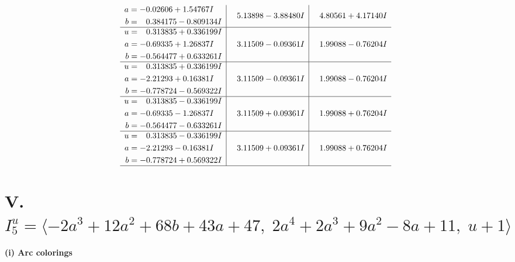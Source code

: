 \documentclass[1p]{elsarticle_modified}
\theoremstyle{definition}
\begin{document}
$$\begin{array}{c|c|c}
\begin{aligned}
a &= -0.02606 + 1.54767 I \\
b &= \phantom{-}0.384175 - 0.809134 I\end{aligned}
 & \phantom{-}5.13898 - 3.88480 I & \phantom{-}4.80561 + 4.17140 I \\ \hline\begin{aligned}
u &= \phantom{-}0.313835 + 0.336199 I \\
a &= -0.69335 + 1.26837 I \\
b &= -0.564477 + 0.633261 I\end{aligned}
 & \phantom{-}3.11509 - 0.09361 I & \phantom{-}1.99088 - 0.76204 I \\ \hline\begin{aligned}
u &= \phantom{-}0.313835 + 0.336199 I \\
a &= -2.21293 + 0.16381 I \\
b &= -0.778724 - 0.569322 I\end{aligned}
 & \phantom{-}3.11509 - 0.09361 I & \phantom{-}1.99088 - 0.76204 I \\ \hline\begin{aligned}
u &= \phantom{-}0.313835 - 0.336199 I \\
a &= -0.69335 - 1.26837 I \\
b &= -0.564477 - 0.633261 I\end{aligned}
 & \phantom{-}3.11509 + 0.09361 I & \phantom{-}1.99088 + 0.76204 I \\ \hline\begin{aligned}
u &= \phantom{-}0.313835 - 0.336199 I \\
a &= -2.21293 - 0.16381 I \\
b &= -0.778724 + 0.569322 I\end{aligned}
 & \phantom{-}3.11509 + 0.09361 I & \phantom{-}1.99088 + 0.76204 I\\
 \hline 
 \end{array}$$\newpage\newpage\renewcommand{\arraystretch}{1}
\centering \section*{V. $I^u_{5}= \langle -2 a^3+12 a^2+68 b+43 a+47,\;2 a^4+2 a^3+9 a^2-8 a+11,\;u+1 \rangle$}
\flushleft \textbf{(i) Arc colorings}\\
\end{document}
